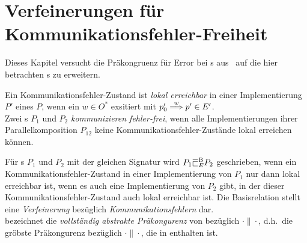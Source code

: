 \chapter{Verfeinerungen für Kommunikationsfehler-Freiheit}

Dieses Kapitel versucht die Präkongruenz für Error bei \EIO{}s
aus~\cite{Schinko2016BA} auf die hier betrachten \MEIO{}s zu erweitern.

\begin{Def}
  Ein Kommunikationsfehler-Zustand ist \emph{lokal erreichbar} in einer
  Implementierung $P'$ eines \MEIO{} $P$, wenn ein $w\in O^*$ exsitiert mit
  $p'_0 \weakmust[w]p'\in E'$.\\
  Zwei \MEIO{}s $P_1$ und $P_2$ \emph{kommunizieren fehler-frei}, wenn alle
  Implementierungen ihrer Parallelkomposition $P_{12}$ keine
  Kommunikationsfehler-Zustände lokal erreichen können.
\end{Def}

\begin{Def}
  Für \MEIO{}s $P_1$ und $P_2$ mit der gleichen Signatur  wird $P_1\EBRel{} P_2$ geschrieben, wenn ein
  Kommunikationsfehler-Zustand in einer Implementierung von $P_1$ nur dann
  lokal erreichbar ist, wenn es auch eine Implementierung von $P_2$ gibt, in
  der dieser Kommunikationsfehler-Zustand auch lokal erreichbar ist. Die
  Basisrelation stellt eine \emph{Verfeinerung} bezüglich
  \emph{Kommunikationsfehlern} dar.\\
  \ECRel{} bezeichnet die \emph{vollständig abstrakte Präkongurenz} von
  \EBRel{} bezüglich $\cdot\|\cdot$, d.h.\ die gröbste Präkongurenz bezüglich
  $\cdot\|\cdot$, die in \EBRel{} enthalten ist.
\end{Def}
